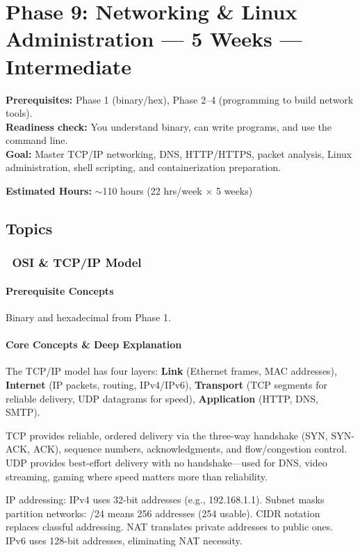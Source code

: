 \documentclass[11pt, a4paper, oneside]{report}
\newcommand{\mustmaster}[1]{\subsubsection{\texorpdfstring{\fcolorbox{blue!40!black}{blue!8}{\footnotesize\bfseries\color{blue!40!black} MUST MASTER}~#1}{#1}}}
\begin{document}
\section[Phase 9: Networking \& Linux]{Phase 9: Networking \& Linux Administration --- 5 Weeks --- Intermediate}

\begin{prereqbox}
\textbf{Prerequisites:} Phase 1 (binary/hex), Phase 2--4 (programming to build network tools).\\
\textbf{Readiness check:} You understand binary, can write programs, and use the command line.\\
\textbf{Goal:} Master TCP/IP networking, DNS, HTTP/HTTPS, packet analysis, Linux administration, shell scripting, and containerization preparation.


\textbf{Estimated Hours:} $\sim$110 hours (22 hrs/week $\times$ 5 weeks)
\end{prereqbox}

\subsection*{Topics}

\mustmaster{OSI \& TCP/IP Model}

\paragraph{Prerequisite Concepts} Binary and hexadecimal from Phase 1.

\paragraph{Core Concepts \& Deep Explanation} The TCP/IP model has four layers: \textbf{Link} (Ethernet frames, MAC addresses), \textbf{Internet} (IP packets, routing, IPv4/IPv6), \textbf{Transport} (TCP segments for reliable delivery, UDP datagrams for speed), \textbf{Application} (HTTP, DNS, SMTP).

TCP provides reliable, ordered delivery via the three-way handshake (SYN, SYN-ACK, ACK), sequence numbers, acknowledgments, and flow/congestion control. UDP provides best-effort delivery with no handshake---used for DNS, video streaming, gaming where speed matters more than reliability.

IP addressing: IPv4 uses 32-bit addresses (e.g., 192.168.1.1). Subnet masks partition networks: /24 means 256 addresses (254 usable). CIDR notation replaces classful addressing. NAT translates private addresses to public ones. IPv6 uses 128-bit addresses, eliminating NAT necessity.
\end{document}

